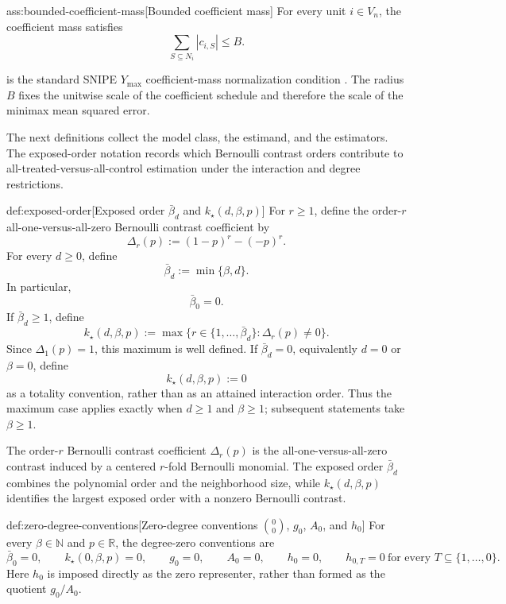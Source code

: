 \documentclass[11pt]{article}
\begin{document}
\begin{assumptionv}{ass:bounded-coefficient-mass}[Bounded coefficient mass]
For every unit \(i\in V_n\), the coefficient mass satisfies
\[
\sum_{S\subseteq N_i}|c_{i,S}|\le B .
\]
\end{assumptionv}

 is the standard SNIPE \(Y_{\max}\) coefficient-mass normalization condition \citep{CortezRodriguezEichhornYu2023}. The radius \(B\) fixes the unitwise scale of the coefficient schedule and therefore the scale of the minimax mean squared error.

The next definitions collect the model class, the estimand, and the estimators. The exposed-order notation records which Bernoulli contrast orders contribute to all-treated-versus-all-control estimation under the interaction and degree restrictions.

\begin{definitionv}{def:exposed-order}[Exposed order \(\bar\beta_d\) and \(k_\star(d,\beta,p)\)]
For \(r\ge1\), define the order-\(r\) all-one-versus-all-zero Bernoulli contrast coefficient by
\[
\Delta_r(p):=(1-p)^r-(-p)^r .
\]
For every \(d\ge0\), define
\[
\bar\beta_d:=\min\{\beta,d\}.
\]
In particular,
\[
\bar\beta_0=0 .
\]
If \(\bar\beta_d\ge1\), define
\[
k_\star(d,\beta,p)
:=
\max\bigl\{r\in\{1,\ldots,\bar\beta_d\}:\Delta_r(p)\ne0\bigr\}.
\]
Since \(\Delta_1(p)=1\), this maximum is well defined. If \(\bar\beta_d=0\), equivalently \(d=0\) or \(\beta=0\), define
\[
k_\star(d,\beta,p):=0
\]
as a totality convention, rather than as an attained interaction order. Thus the maximum case applies exactly when \(d\ge1\) and \(\beta\ge1\); subsequent statements take \(\beta\ge1\).
\end{definitionv}

The order-\(r\) Bernoulli contrast coefficient \(\Delta_r(p)\) is the all-one-versus-all-zero contrast induced by a centered \(r\)-fold Bernoulli monomial. The exposed order \(\bar\beta_d\) combines the polynomial order and the neighborhood size, while \(k_\star(d,\beta,p)\) identifies the largest exposed order with a nonzero Bernoulli contrast.

\begin{definitionv}{def:zero-degree-conventions}[Zero-degree conventions \(\binom{0}{0}\), \(g_0\), \(A_0\), and \(h_0\)]
For every \(\beta\in\mathbb N\) and \(p\in\mathbb R\), the degree-zero conventions are
\[
\bar\beta_0=0,
\qquad
k_\star(0,\beta,p)=0,
\qquad
g_0=0,
\qquad
A_0=0,
\qquad
h_0=0,
\qquad
h_{0,T}=0\ \text{for every }T\subseteq\{1,\ldots,0\}.
\]
Here \(h_0\) is imposed directly as the zero representer, rather than formed as the quotient \(g_0/A_0\).
\end{definitionv}
\end{document}
